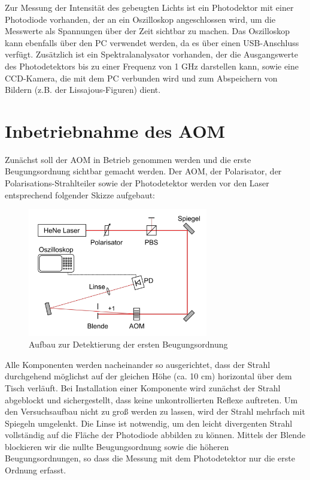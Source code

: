 \documentclass[bigchapter,colorback,accentcolor=tud4b,linedtoc,11pt]{tudreport}
\begin{document}
Zur Messung der Intensität des gebeugten Lichts ist ein Photodektor mit einer Photodiode vorhanden, der an ein Oszilloskop angeschlossen wird, um die Messwerte als Spannungen über der Zeit sichtbar zu machen. Das Oszilloskop kann ebenfalls über den PC verwendet werden, da es über einen USB-Anschluss verfügt. Zusätzlich ist ein Spektralanalysator vorhanden, der die Ausgangswerte des Photodetektors bis zu einer Frequenz von 1 GHz darstellen kann, sowie eine CCD-Kamera, die mit dem PC verbunden wird und zum Abspeichern von Bildern (z.B. der Lissajous-Figuren) dient.

\section{Inbetriebnahme des AOM}

Zunächst soll der AOM in Betrieb genommen werden und die erste Beugungsordnung sichtbar gemacht werden. Der AOM, der Polarisator, der Polarisations-Strahlteiler sowie der Photodetektor werden vor den Laser entsprechend folgender Skizze aufgebaut:

\begin{figure}[H] 
  \centering
     \includegraphics[width=0.7\textwidth]{img/inbetriebnahme.jpg}
  \caption[Cap for listoffigures]{Aufbau zur Detektierung der ersten Beugungsordnung \cite{Anleitung}}
  \label{fig:Bild0}
\end{figure}

Alle Komponenten werden nacheinander so ausgerichtet, dass der Strahl durchgehend möglichst auf der gleichen Höhe (ca. 10 cm) horizontal über dem Tisch verläuft. Bei Installation einer Komponente wird zunächst der Strahl abgeblockt und sichergestellt, dass keine unkontrollierten Reflexe auftreten. Um den Versuchsaufbau nicht zu groß werden zu lassen, wird der Strahl mehrfach mit Spiegeln umgelenkt. Die Linse ist notwendig, um den leicht divergenten Strahl vollständig auf die Fläche der Photodiode abbilden zu können. Mittels der Blende blockieren wir die nullte Beugungsordnung sowie die höheren Beugungsordnungen, so dass die Messung mit dem Photodetektor nur die erste Ordnung erfasst.
\end{document}
